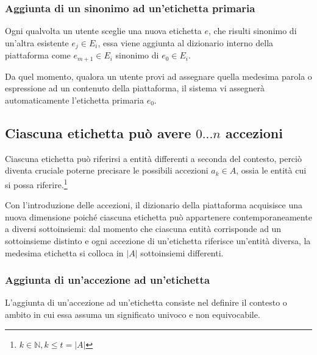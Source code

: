 \documentclass[10pt,a4paper,headinclude,footinclude,hidelinks]{scrreprt} %
\begin{document}
	\subsubsection{Aggiunta di un sinonimo ad un'etichetta primaria}
	Ogni qualvolta un utente sceglie una nuova etichetta $e$, che risulti sinonimo di un'altra esistente $e_j \in E_i$, essa viene aggiunta al dizionario interno della piattaforma come $e_{m+1} \in E_i$ sinonimo di $e_0 \in E_i$.

	Da quel momento, qualora un utente provi ad assegnare quella medesima parola o espressione ad un contenuto della piattaforma, il sistema vi assegnerà automaticamente l'etichetta primaria $e_0$.

	\subsection[Accezioni]{Ciascuna etichetta può avere $0...n$ accezioni}
	Ciascuna etichetta può riferirsi a entità differenti a seconda del contesto, perciò diventa cruciale poterne precisare le possibili accezioni $a_k \in A$, ossia le entità cui si possa riferire.\footnote{$k \in \mathbb{N}, k \leq t=\left|A\right|$}
	
	Con l'introduzione delle accezioni, il dizionario della piattaforma acquisisce una nuova dimensione poiché ciascuna etichetta può appartenere contemporaneamente a diversi sottoinsiemi: dal momento che ciascuna entità corrisponde ad un sottoinsieme distinto e ogni accezione di un'etichetta riferisce un'entità diversa, la medesima etichetta si colloca in $\left|A\right|$ sottoinsiemi differenti.

	\subsubsection{Aggiunta di un'accezione ad un'etichetta}
	L'aggiunta di un'accezione ad un'etichetta consiste nel definire il contesto o ambito in cui essa assuma un significato univoco e non equivocabile.
\end{document}
